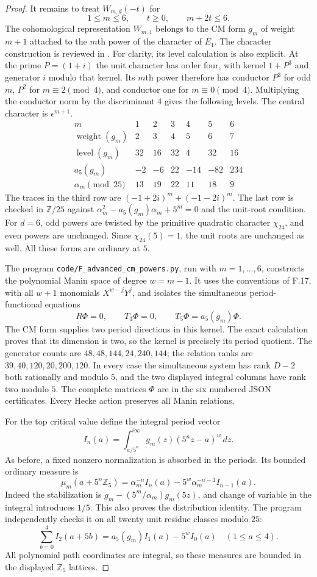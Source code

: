 \begin{proof}
It remains to treat $W_{m,d}(-t)$ for
\[
 1\le m\le6,\qquad t\ge0,\qquad m+2t\le6.
\]
The cohomological representation $W_{m,1}$ belongs to the
CM form $g_m$ of weight $m+1$ attached to the $m$th power
of the character of $E_1$. The character construction is
reviewed in \citet[\S2.5 and pp.~15--16]{FA_LiLongTu2018}.
For clarity, its level calculation is also explicit. At the
prime $P=(1+i)$ the unit character has order four, with
kernel $1+P^3$ and generator $i$ modulo that kernel.
Its $m$th power therefore has conductor $P^3$ for odd $m$,
$P^2$ for $m\equiv2\pmod4$, and conductor one for
$m\equiv0\pmod4$. Multiplying the conductor norm by the
discriminant $4$ gives the following levels. The central
character is $\epsilon^{m+1}$.
\[
\begin{array}{c|rrrrrr}
m&1&2&3&4&5&6\\\hline
\operatorname{weight}(g_m)&2&3&4&5&6&7\\
\operatorname{level}(g_m)&32&16&32&4&32&16\\
a_5(g_m)&-2&-6&22&-14&-82&234\\
\alpha_m\pmod {25}&13&19&22&11&18&9
\end{array}
\]
The traces in the third row are
$(-1+2i)^m+(-1-2i)^m$. The last row is checked in
$\mathbb Z/25$ against
$\alpha_m^2-a_5(g_m)\alpha_m+5^m=0$ and the unit-root
condition. For $d=6$, odd powers are twisted by the primitive
quadratic character $\chi_{24}$, and even powers are unchanged.
Since $\chi_{24}(5)=1$, the unit roots are unchanged as well.
All these forms are ordinary at $5$.

The program \texttt{code/F\_advanced\_cm\_powers.py}, run with
$m=1,\ldots,6$, constructs the polynomial Manin space of
degree $w=m-1$. It uses the conventions of F.17, with all
$w+1$ monomials $X^{w-j}Y^j$, and isolates the simultaneous
period-functional equations
\[
 R\Phi=0,\qquad T_3\Phi=0,\qquad
 T_5\Phi=a_5(g_m)\Phi.
\]
The CM form supplies two period directions in this kernel.
The exact calculation proves that its dimension is two, so
the kernel is precisely its period quotient. The generator
counts are $48,48,144,24,240,144$; the relation ranks are
$39,40,120,20,200,120$. In every case the simultaneous system
has rank $D-2$ both rationally and modulo $5$, and the two
displayed integral columns have rank two modulo $5$.
The complete matrices $\Phi$ are in the six numbered JSON
certificates. Every Hecke action preserves all Manin relations.

For the top critical value define the integral period vector
\[
 I_n(a)=\int_{a/5^n}^{i\infty}
              g_m(z)(5^nz-a)^w\,dz.
\]
As before, a fixed nonzero normalization is absorbed in the
periods. Its bounded ordinary measure is
\[
 \mu_m(a+5^n\mathbb Z_5)
   =\alpha_m^{-n}I_n(a)
       -5^w\alpha_m^{-n-1}I_{n-1}(a).
\]
Indeed the stabilization is
$g_m-(5^m/\alpha_m)g_m(5z)$, and change of variable in the
integral introduces $1/5$. This also proves the distribution
identity. The program independently checks it on all twenty
unit residue classes modulo $25$:
\[
 \sum_{b=0}^4I_2(a+5b)
       =a_5(g_m)I_1(a)-5^w I_0(a)\quad(1\le a\le4).
\]
All polynomial path coordinates are integral, so these
measures are bounded in the displayed $\mathbb Z_5$ lattices.


\end{proof}
